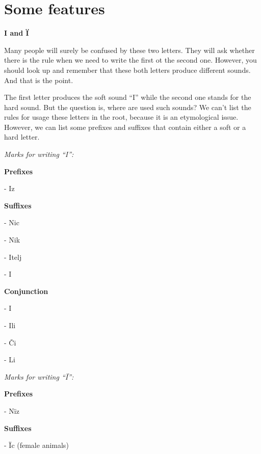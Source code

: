 \section{Some features}

\textbf{I and Ï}

Many people will surely be confused by these two letters. They will ask whether there is the rule when we need to write the first ot the second one. However, you should look up and remember that these both letters produce different sounds. And that is the point. 

The first letter produces the soft sound “I” while the second one stands for the hard sound. But the question is, where are used such sounds? We can't list the rules for usage these letters in the root, because it is an etymological issue. However, we can list some prefixes and suffixes that contain either a soft or a hard letter.

\textit{Marks for writing “I”:}

\textbf{Prefixes }

- Iz

\textbf{Suffixes}

- Nic

- Nik

- Itelj

- I

\textbf{Conjunction}

- I

- Ili

- Či

- Li

\textit{Marks for writing “Ï”:}

\textbf{Prefixes}

- Nïz

\textbf{Suffixes}

- Ïc (female animals)
